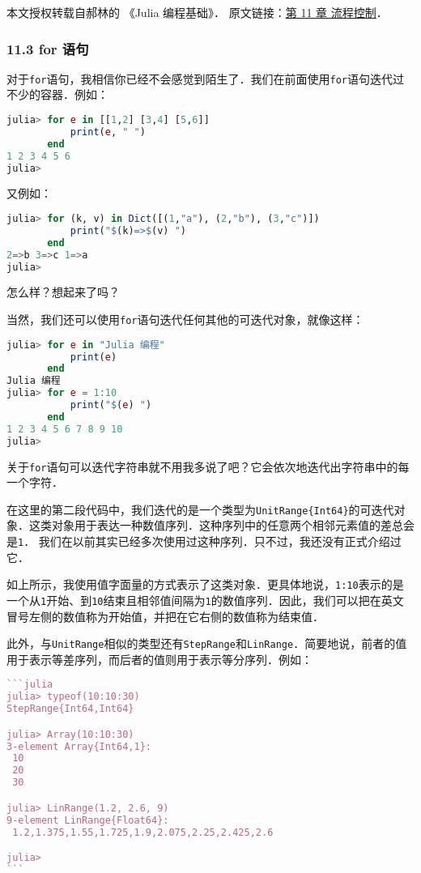 
本文授权转载自郝林的 《Julia 编程基础》． 原文链接：\href{https://github.com/hyper0x/JuliaBasics/blob/master/book/ch11.md}{第 11 章 流程控制}．


\subsubsection{11.3 for 语句}

对于\verb`for`语句，我相信你已经不会感觉到陌生了．我们在前面使用\verb`for`语句迭代过不少的容器．例如：
\begin{lstlisting}[language=julia]
julia> for e in [[1,2] [3,4] [5,6]]
           print(e, " ")
       end
1 2 3 4 5 6 
julia> 
\end{lstlisting}

又例如：
\begin{lstlisting}[language=julia]
julia> for (k, v) in Dict([(1,"a"), (2,"b"), (3,"c")])
           print("$(k)=>$(v) ")
       end
2=>b 3=>c 1=>a 
julia> 
\end{lstlisting}

怎么样？想起来了吗？

当然，我们还可以使用\verb|for|语句迭代任何其他的可迭代对象，就像这样：
\begin{lstlisting}[language=julia]
julia> for e in "Julia 编程"
           print(e)
       end
Julia 编程
julia> for e = 1:10
           print("$(e) ")
       end
1 2 3 4 5 6 7 8 9 10 
julia> 
\end{lstlisting}

关于\verb|for|语句可以迭代字符串就不用我多说了吧？它会依次地迭代出字符串中的每一个字符．

在这里的第二段代码中，我们迭代的是一个类型为\verb|UnitRange{Int64}|的可迭代对象．这类对象用于表达一种数值序列．这种序列中的任意两个相邻元素值的差总会是\verb`1`．
我们在以前其实已经多次使用过这种序列．只不过，我还没有正式介绍过它．

如上所示，我使用值字面量的方式表示了这类对象．更具体地说，\verb|1:10|表示的是一个从\verb|1|开始、到\verb|10|结束且相邻值间隔为\verb|1|的数值序列．因此，我们可以把在英文冒号左侧的数值称为开始值，并把在它右侧的数值称为结束值．

此外，与\verb|UnitRange|相似的类型还有\verb|StepRange|和\verb|LinRange|．简要地说，前者的值用于表示等差序列，而后者的值则用于表示等分序列．例如：
\begin{lstlisting}[language=julia]
```julia
julia> typeof(10:10:30)
StepRange{Int64,Int64}

julia> Array(10:10:30)
3-element Array{Int64,1}:
 10
 20
 30

julia> LinRange(1.2, 2.6, 9)
9-element LinRange{Float64}:
 1.2,1.375,1.55,1.725,1.9,2.075,2.25,2.425,2.6

julia> 
```
\end{lstlisting}


